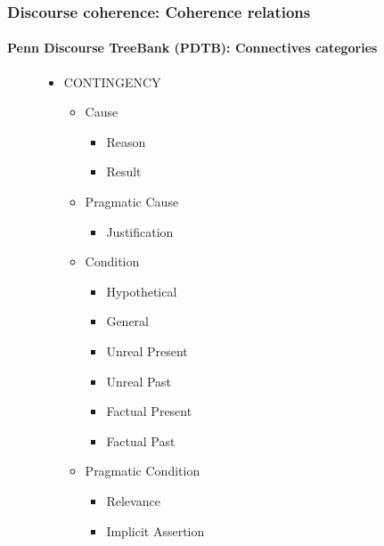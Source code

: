 \documentclass[xcolor=table]{beamer}
\begin{document}
\begin{frame}
	\frametitle{Discourse coherence: Coherence relations}
	\framesubtitle{Penn Discourse TreeBank (PDTB): Connectives categories}
	
	\begin{figure}
		\centering\vspace{-6pt}
		\begin{tcolorbox}[colback=white, colframe=blue, boxrule=1pt, text width=.9\textwidth]
		\begin{minipage}{.3\textwidth}
			\tiny\bfseries\vspace{-6pt}
			\begin{itemize}
				\item CONTINGENCY
				\begin{itemize}\tiny\bfseries
					\item Cause
					\begin{itemize}\tiny\bfseries
						\item Reason
						\item Result
					\end{itemize}
					\item Pragmatic Cause
					\begin{itemize}\tiny\bfseries
						\item Justification
					\end{itemize}
					\item Condition
					\begin{itemize}\tiny\bfseries
						\item Hypothetical
						\item General
						\item Unreal Present
						\item Unreal Past
						\item Factual Present
						\item Factual Past
					\end{itemize}
					\item Pragmatic Condition
					\begin{itemize}\tiny\bfseries
						\item Relevance
						\item Implicit Assertion
					\end{itemize}
				\end{itemize}
			\end{itemize}
		\end{minipage}
		\begin{minipage}{.3\textwidth}
			\tiny\bfseries
			\begin{itemize}\tiny\bfseries

\end{itemize}
\end{minipage}
\end{tcolorbox}
\end{figure}
\end{frame}
\end{document}
